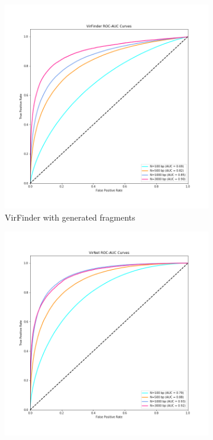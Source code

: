 \documentclass[conference]{IEEEtran}
\begin{document}
\begin{figure}[!htbp]
	\centering
\begin{subfigure}{0.3\textwidth}
	\includegraphics[width=\linewidth]{imgs/roc_auc.png}
	\caption{VirFinder with generated fragments} 
	\label{fig:roc_auc_virfindera}
\end{subfigure}
\begin{subfigure}{0.3\textwidth}
	\includegraphics[width=\linewidth]{imgs/virnet_roc_auc.png}

\end{subfigure}
\end{figure}
\end{document}
